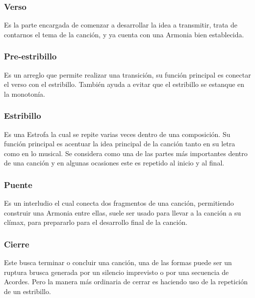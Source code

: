 \documentclass[12pt, a4paper, titlepage]{report}
\begin{document}
				\subsubsection*{Verso}\par
				Es la parte encargada de comenzar a desarrollar la idea a transmitir, trata de contarnos el tema de la canción, y ya cuenta con una \gls{Armonia}  bien establecida.\par
				\subsubsection*{Pre-estribillo}\par
				Es un arreglo que permite realizar una transición, su función principal es conectar el verso con el estribillo. También ayuda a evitar que el estribillo se estanque en la monotonía.\par
				\subsubsection*{Estribillo}\par
				Es una \gls{Estrofa} la cual se repite varias veces dentro de una composición. Su función principal es acentuar la idea principal de la canción tanto en su letra como en lo musical. Se considera como una de las partes más importantes dentro de una canción y en algunas ocasiones este es repetido al inicio y al final.\par
				\subsubsection*{Puente}\par
				Es un interludio el cual conecta dos fragmentos de una canción, permitiendo construir una \gls{Armonia}  entre ellas, suele ser usado para llevar a la canción a su clímax, para prepararlo para el desarrollo final de la canción.\par
				\subsubsection*{Cierre}\par
				Este busca terminar o concluir una canción, una de las formas puede ser un ruptura brusca generada por un silencio imprevisto o por una secuencia de \gls{Acordes}. Pero la manera más ordinaria de cerrar es haciendo uso de la repetición de un estribillo.\par

			
\end{document}
